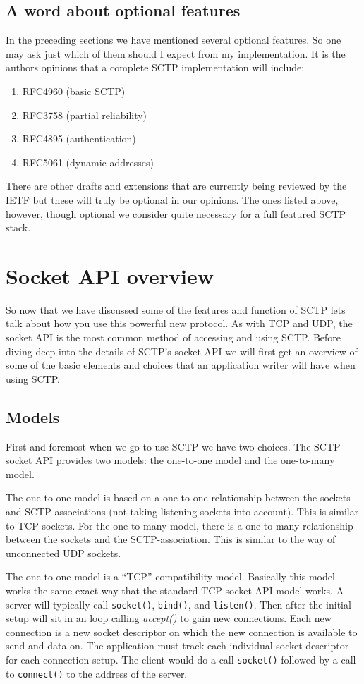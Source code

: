 \documentclass[conference]{IEEEtran}
\begin{document}
\subsection{A word about optional features}
\label{options}
In the preceding sections we have mentioned several optional
features. So one may ask just which of them should I expect from
my implementation. It is the authors opinions that a complete 
SCTP implementation will include:
\begin{enumerate}
 \item  RFC4960 (basic SCTP)
 \item  RFC3758 (partial reliability)
 \item  RFC4895 (authentication)
 \item  RFC5061 (dynamic addresses)
\end{enumerate}

There are other drafts and extensions that are currently being
reviewed by the IETF but these will truly be optional in our
opinions. The ones listed above, however, though optional we
consider quite necessary for a full featured SCTP stack.

\section{Socket API overview}
So now that we have discussed some of the features and function of SCTP lets
talk about how you use this powerful new protocol. As with TCP and UDP, the socket
API is the most common method of accessing and using SCTP. Before diving deep into
the details of SCTP's socket API we will first get an overview of some of the
basic elements and choices that an application writer will have when using
SCTP.

\subsection{Models}
First and foremost when we go to use SCTP we have two choices.
The SCTP socket API provides two models: the one-to-one model and the
one-to-many model.

The one-to-one model is based on a one to one relationship between the sockets and
SCTP-associations (not taking listening sockets into account). This is similar to
TCP sockets.
For the one-to-many model, there is a one-to-many relationship between the sockets
and the SCTP-association. This is similar to the way of unconnected UDP sockets.

The one-to-one model is a ``TCP'' compatibility model. Basically this model
works the same exact way that the standard TCP socket API model works.
A server will typically call \texttt{socket()}, \texttt{bind()}, and \texttt{listen()}. Then after
the initial setup will sit in an loop calling \emph{accept()} to gain new connections.
Each new connection is a new socket descriptor on which the new
connection is available to send and data on. The application must track each individual socket
descriptor for each connection setup.  The client would do a call \texttt{socket()}  followed
by a call to \texttt{connect()} to the address of the server. 
\end{document}

